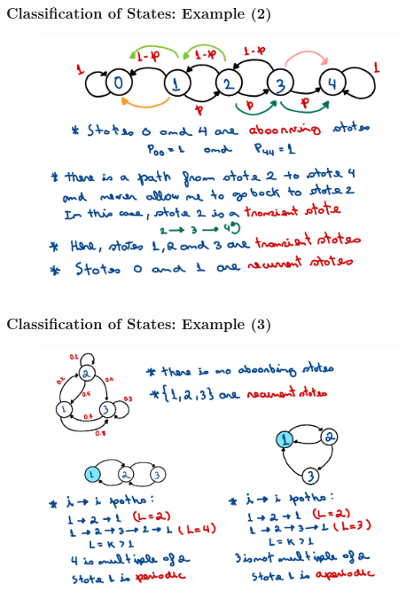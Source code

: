 \begin{frame}
    \frametitle{Classification of States: Example (2)}
        \begin{figure}
            \centering
            \includegraphics[width=0.95\textwidth]{slides/figures/classification_states_example_two.pdf}
        \end{figure}
\end{frame}

\begin{frame}
    \frametitle{Classification of States: Example (3)}
        \begin{figure}
            \centering
            \includegraphics[width=0.95\textwidth]{slides/figures/classification_states_example_three.pdf}
        \end{figure}
\end{frame}


